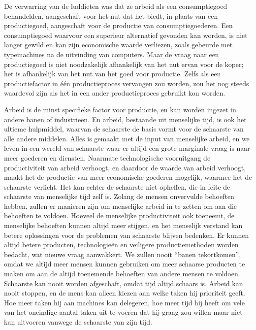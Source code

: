 De verwarring van de luddieten was dat ze arbeid als een consumptiegoed behandelden, aangeschaft voor het nut dat het biedt, in plaats van een productiegoed, aangeschaft voor de productie van consumptiegoederen. Een consumptiegoed waarvoor een superieur alternatief gevonden kan worden, is niet langer gewild en kan zijn economische waarde verliezen, zoals gebeurde met typemachines na de uitvinding van computers. Maar de vraag naar een productiegoed is niet noodzakelijk afhankelijk van het nut ervan voor de koper; het is afhankelijk van het nut van het goed voor productie. Zelfs als een productiefactor in één productieproces vervangen zou worden, zou het nog steeds waardevol zijn als het in een ander productieproces gebruikt kon worden.

Arbeid is de minst specifieke factor voor productie, en kan worden ingezet in andere banen of industrieën. En arbeid, bestaande uit menselijke tijd, is ook het ultieme hulpmiddel, waarvan de schaarste de basis vormt voor de schaarste van alle andere middelen. Alles is gemaakt met de input van menselijke arbeid, en we leven in een wereld van schaarste waar er altijd een grote marginale vraag is naar meer goederen en diensten. Naarmate technologische vooruitgang de productiviteit van arbeid verhoogt, en daardoor de waarde van arbeid verhoogt, maakt het de productie van meer economische goederen mogelijk, waarmee het de schaarste verlicht. Het kan echter de schaarste niet opheffen, die in feite de schaarste van menselijke tijd zelf is. Zolang de mensen onvervulde behoeften hebben, zullen er manieren zijn om menselijke arbeid in te zetten om aan die behoeften te voldoen. Hoeveel de menselijke productiviteit ook toeneemt, de menselijke behoeften kunnen altijd meer stijgen, en het menselijk verstand kan betere oplossingen voor de problemen van schaarste blijven bedenken. Er kunnen altijd betere producten, technologieën en veiligere productiemethoden worden bedacht, wat nieuwe vraag aanwakkert. We zullen nooit ``banen tekortkomen'', omdat we altijd meer mensen kunnen gebruiken om meer schaarse producten te maken om aan de altijd toenemende behoeften van andere mensen te voldoen. Schaarste kan nooit worden afgeschaft, omdat tijd altijd schaars is. Arbeid kan nooit stoppen, en de mens kan alleen kiezen aan welke taken hij prioriteit geeft. Hoe meer taken hij aan machines kan delegeren, hoe meer tijd hij heeft om vele van het oneindige aantal taken uit te voeren dat hij graag zou willen maar niet kan uitvoeren vanwege de schaarste van zijn tijd.

